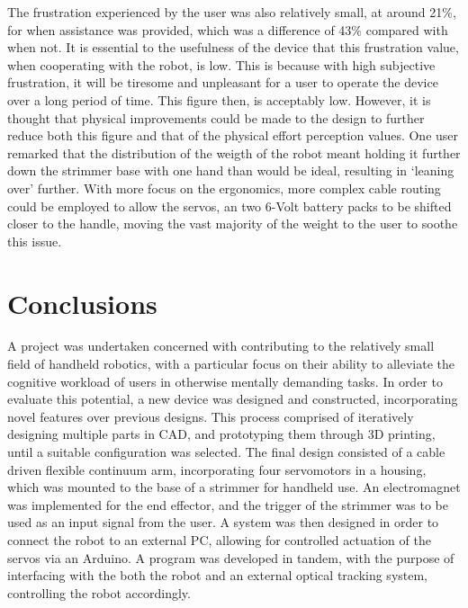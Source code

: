 \documentclass[11pt]{article}
\begin{document}
The frustration experienced by the user was also relatively small, at around 21\%, for when assistance was provided, which was a difference of 43\% compared with when not. It is essential to the usefulness of the device that this frustration value, when cooperating with the robot, is low. This is because with high subjective frustration, it will be tiresome and unpleasant for a user to operate the device over a long period of time. This figure then, is acceptably low. However, it is thought that physical improvements could be made to the design to further reduce both this figure and that of the physical effort perception values. One user remarked that the distribution of the weigth of the robot meant holding it further down the strimmer base with one hand than would be ideal, resulting in `leaning over' further. With more focus on the ergonomics, more complex cable routing could be employed to allow the servos, an two 6-Volt battery packs to be shifted closer to the handle, moving the vast majority of the weight to the user to soothe this issue.

 

\pagebreak
\section{Conclusions}

A project was undertaken concerned with contributing to the relatively small field of handheld robotics, with a particular focus on their ability to alleviate the cognitive workload of users in otherwise mentally demanding tasks. In order to evaluate this potential, a new device was designed and constructed, incorporating novel features over previous designs. This process comprised of iteratively designing multiple parts in CAD, and prototyping them through 3D printing, until a suitable configuration was selected. The  final design consisted of a cable driven flexible continuum arm, incorporating four servomotors in a housing, which was mounted to the base of a strimmer for handheld use. An electromagnet was implemented for the end effector, and the trigger of the strimmer was to be used as an input signal from the user. A system was then designed in order to connect the robot to an external PC, allowing for controlled actuation of the servos via an Arduino. A program was developed in tandem, with the purpose of interfacing with the both the robot and an external optical tracking system, controlling the robot accordingly.
\end{document}
